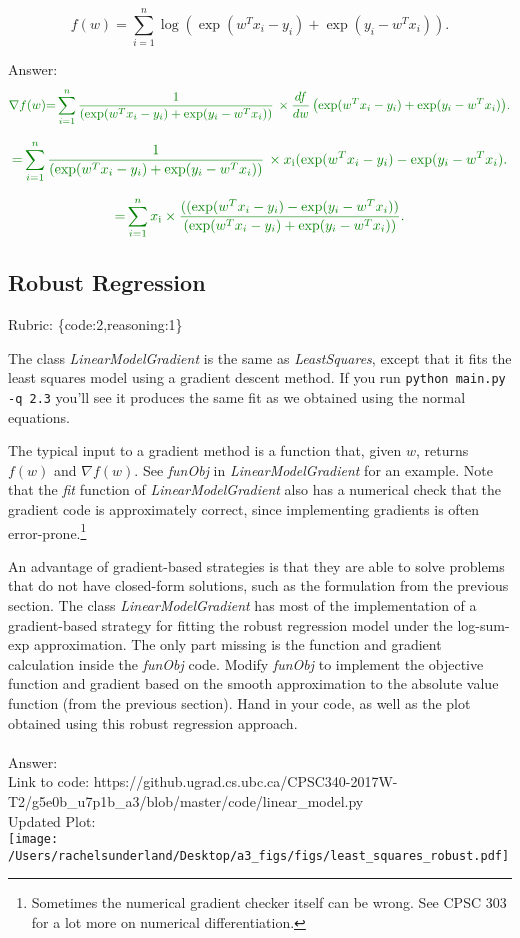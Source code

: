 \documentclass{article}
\def\rubric#1{\gre{Rubric: \{#1\}}}{}
\def\blu#1{{\color{blu}#1}}
\def\gre#1{{\color{gre}#1}}
\begin{document}
\[
f(w) {=} \sum_{i=1}^n  \log\left(\exp(w^Tx_i - y_i) + \exp(y_i - w^Tx_i)\right).
\]

 \gre {Answer: }
$$ \gre{ \nabla f(w) {=} \sum_{i=1}^n \frac{1}{\left(\exp(w^Tx_i - y_i) + \exp(y_i - w^Tx_i)\right)} \thinspace \times \frac{df}{dw} \thinspace {\left(\exp(w^Tx_i - y_i) + \exp(y_i - w^Tx_i)\right)} .}
$$

$$ \gre{ {=} \sum_{i=1}^n \frac{1}{\left(\exp(w^Tx_i - y_i) + \exp(y_i - w^Tx_i)\right)} \thinspace \times x\textsubscript{i}   {(\exp(w^Tx_i - y_i)} - \exp(y_i - w^Tx_i).}
$$

$$ \gre{ {=} \sum_{i=1}^n x\textsubscript{i} \times \frac{({(\exp(w^Tx_i - y_i)} - \exp(y_i - w^Tx_i))}{\left(\exp(w^Tx_i - y_i) + \exp(y_i - w^Tx_i)\right)} .}
$$

\subsection{Robust Regression}
\rubric{code:2,reasoning:1}

The class \emph{LinearModelGradient} is the same as \emph{LeastSquares}, except that it fits the least squares model using a gradient descent method. If you run \verb|python main.py -q 2.3| you'll see it produces the same fit as we obtained using the normal equations.

The typical input to a gradient method is a function that, given $w$, returns $f(w)$ and $\nabla f(w)$. See \emph{funObj} in \emph{LinearModelGradient} for an example. Note that the \emph{fit} function of \emph{LinearModelGradient} also has a numerical check that the gradient code is approximately correct, since implementing gradients is often error-prone.\footnote{Sometimes the numerical gradient checker itself can be wrong. See CPSC 303 for a lot more on numerical differentiation.}

An advantage of gradient-based strategies is that they are able to solve
problems that do not have closed-form solutions, such as the formulation from the
previous section. The class \emph{LinearModelGradient} has most of the implementation
of a gradient-based strategy for fitting the robust regression model under the log-sum-exp approximation.
The only part missing is the function and gradient calculation inside the \emph{funObj} code.
\blu{Modify \emph{funObj} to implement the objective function and gradient based on the smooth
approximation to the absolute value function (from the previous section). Hand in your code, as well
as the plot obtained using this robust regression approach.}
\\
\\ \gre {Answer: }
\\ \gre{Link to code: https://github.ugrad.cs.ubc.ca/CPSC340-2017W-T2/g5e0b\_u7p1b\_a3/blob/master/code/linear\_model.py}
\\ \gre{Updated Plot: }
\\ \texttt{[image: /Users/rachelsunderland/Desktop/a3\_figs/figs/least\_squares\_robust.pdf]}
\end{document}
